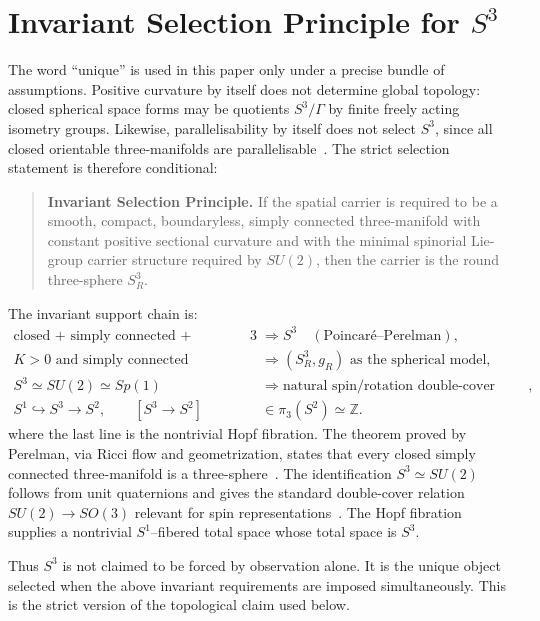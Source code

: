 \documentclass[aps,prd,onecolumn,superscriptaddress,longbibliography,nofootinbib,notitlepage]{revtex4-2}
\begin{document}
\section{Invariant Selection Principle for \texorpdfstring{$S^3$}{S3}}
\label{sec:invariant-selection}

The word ``unique'' is used in this paper only under a precise bundle of
assumptions. Positive curvature by itself does not determine global topology:
closed spherical space forms may be quotients $S^3/\Gamma$ by finite freely acting
isometry groups. Likewise, parallelisability by itself does not select $S^3$, since
all closed orientable three-manifolds are parallelisable~\cite{BenedettiLisca2018}.
The strict selection statement is therefore conditional:
\begin{quote}
\textbf{Invariant Selection Principle.}
If the spatial carrier is required to be a smooth, compact, boundaryless,
simply connected three-manifold with constant positive sectional curvature and
with the minimal spinorial Lie-group carrier structure required by $SU(2)$, then
the carrier is the round three-sphere $S^3_R$.
\end{quote}

The invariant support chain is:
\begin{align}
\text{closed + simply connected + dimension }3
  &\Rightarrow S^3
  \quad (\text{Poincar\'e--Perelman}), \\
K>0\text{ and simply connected}
  &\Rightarrow (S^3_R,g_R)\text{ as the spherical model}, \\
S^3 \simeq SU(2) \simeq Sp(1)
  &\Rightarrow \text{natural spin/rotation double-cover carrier}, \\
S^1 \hookrightarrow S^3 \to S^2,
  \qquad [S^3\to S^2]
  &\in\pi_3(S^2)\simeq\mathbb Z .
\end{align}
where the last line is the nontrivial Hopf fibration. The theorem proved by
Perelman, via Ricci flow and geometrization, states that every closed simply
connected three-manifold is a three-sphere~\cite{MorganTian2007,ClayPoincare}.
The identification $S^3\simeq SU(2)$ follows from unit quaternions and gives the
standard double-cover relation $SU(2)\to SO(3)$ relevant for spin
representations~\cite{SU2LieNotes}. The Hopf fibration supplies a nontrivial
$S^1$--fibered total space whose total space is $S^3$.

Thus $S^3$ is not claimed to be forced by observation alone. It is the unique
object selected when the above invariant requirements are imposed simultaneously.
This is the strict version of the topological claim used below.
\end{document}
